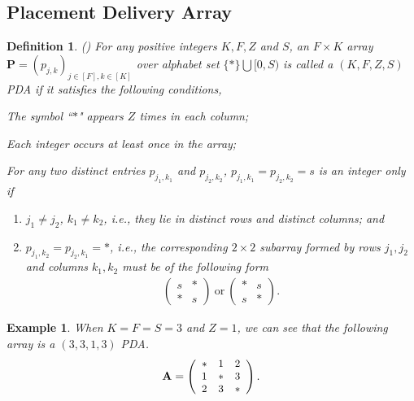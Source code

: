 \documentclass[onecolumn,10pt]{IEEEtran}
\theoremstyle{mythm}
\newtheorem{example}{Example}
\newtheorem{definition}{Definition}
\newtheorem{remark}{Remark}
\begin{document}
\subsection{Placement Delivery Array}
\label{subsec:PDA}
\begin{definition}
\label{def-PDA}
(\cite{YCTC}) For any positive integers $K,F, Z$ and $S$, an $F\times K$ array $\mathbf{P}=(p_{j,k})_{j\in[F] ,k\in[K]}$ over alphabet set $\{*\}\bigcup [0,S)$ is called a $(K,F,Z,S)$ PDA if it satisfies the following conditions,
 \item [C$1$.] The symbol ``$*$" appears $Z$ times in each column;
 \item [C$2$.] Each integer occurs at least once in the array;
 \item [C$3$.] For any two distinct entries $p_{j_1,k_1}$ and $p_{j_2,k_2}$, $p_{j_1,k_1}=p_{j_2,k_2}=s$ is an integer only if
 \begin{enumerate}
 \item [a.] $j_1\ne j_2$, $k_1\ne k_2$, i.e., they lie in distinct rows and distinct columns; and
  \item [b.] $p_{j_1,k_2}=p_{j_2,k_1}=*$, i.e., the corresponding $2\times 2$ subarray formed by rows $j_1,j_2$ and columns $k_1,k_2$ must be of the following form
 \begin{align*}
 \left(\begin{array}{cc}
 s & *\\
 * & s
 \end{array}\right)~\textrm{or}~
 \left(\begin{array}{cc}
 * & s\\
 s & *
 \end{array}\right).
 \end{align*}
 \end{enumerate}
\end{definition}
\begin{example}
\label{example-1}
When $K=F=S=3$ and $Z=1$, we can see that the following array is a $(3,3,1,3)$ PDA.
\begin{eqnarray}
\label{eq-PDA()3313}
\mathbf{A}=\left(\small{
     \begin{array}{ccc}
       \ast & 1 & 2 \\
       1 & \ast & 3 \\
       2 & 3 & \ast \\
     \end{array}}
   \right).
   \end{eqnarray}
\end{example}
\end{document}
